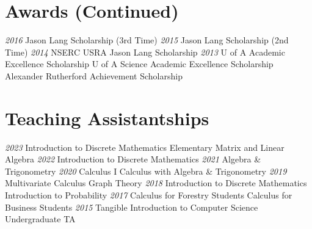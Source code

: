 \documentclass[a4paper]{cv-friggeri}
\begin{document}
\begin{asidenotit}
\section{Awards (Continued)}
\emph{2016}
Jason Lang Scholarship
(3rd Time)
\emph{2015}
Jason Lang Scholarship
(2nd Time)
\emph{2014}
NSERC USRA
Jason Lang Scholarship
\emph{2013}
U of A Academic Excellence Scholarship
U of A Science Academic Excellence Scholarship
Alexander Rutherford Achievement Scholarship
~
\section{Teaching Assistantships}
\emph{2023}
Introduction to Discrete Mathematics
Elementary Matrix and Linear Algebra
\emph{2022}
Introduction to Discrete Mathematics
\emph{2021}
Algebra \& Trigonometry
\emph{2020}
Calculus I
Calculus with Algebra \& Trigonometry
\emph{2019}
Multivariate Calculus
Graph Theory
\emph{2018}
Introduction to Discrete Mathematics
Introduction to Probability
\emph{2017}
Calculus for Forestry Students
Calculus for Business Students
\emph{2015}
Tangible Introduction to Computer Science Undergraduate TA
\end{asidenotit}
\end{document}

